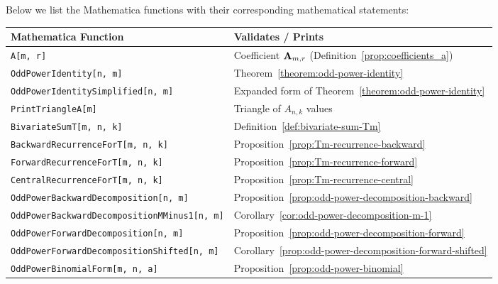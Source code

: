Below we list the Mathematica functions with their corresponding mathematical statements:
\begin{center}
    \renewcommand{\arraystretch}{1.3}
    \begin{tabular}{ll}
        \toprule
        \textbf{Mathematica Function}                       & \textbf{Validates / Prints}                                        \\
        \midrule
        \texttt{A[m, r]}                                    & Coefficient ${\mathbf{A}} \sb{m,r}$ (Definition~\ref{prop:coefficients_a}) \\
        \texttt{OddPowerIdentity[n, m]}                     & Theorem~\ref{theorem:odd-power-identity}                           \\
        \texttt{OddPowerIdentitySimplified[n, m]}           & Expanded form of Theorem~\ref{theorem:odd-power-identity}          \\
        \texttt{PrintTriangleA[m]}                          & Triangle of $A_{n,k}$ values                                       \\
        \texttt{BivariateSumT[m, n, k]}                     & Definition~\ref{def:bivariate-sum-Tm}                              \\
        \texttt{BackwardRecurrenceForT[m, n, k]}            & Proposition~\ref{prop:Tm-recurrence-backward}                      \\
        \texttt{ForwardRecurrenceForT[m, n, k]}             & Proposition~\ref{prop:Tm-recurrence-forward}                       \\
        \texttt{CentralRecurrenceForT[m, n, k]}             & Proposition~\ref{prop:Tm-recurrence-central}                       \\
        \texttt{OddPowerBackwardDecomposition[n, m]}        & Proposition~\ref{prop:odd-power-decomposition-backward}            \\
        \texttt{OddPowerBackwardDecompositionMMinus1[n, m]} & Corollary~\ref{cor:odd-power-decomposition-m-1}                    \\
        \texttt{OddPowerForwardDecomposition[n, m]}         & Proposition~\ref{prop:odd-power-decomposition-forward}             \\
        \texttt{OddPowerForwardDecompositionShifted[n, m]}  & Corollary~\ref{prop:odd-power-decomposition-forward-shifted}       \\
        \texttt{OddPowerBinomialForm[m, n, a]}              & Proposition~\ref{prop:odd-power-binomial}                          \\

\end{tabular}
\end{center}
